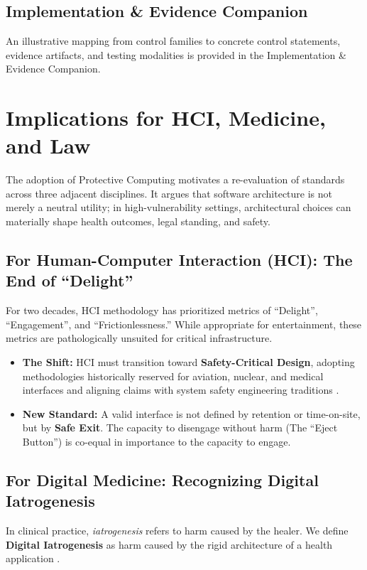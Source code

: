 \documentclass[12pt]{article}
\begin{document}
\subsection{Implementation \& Evidence Companion}
An illustrative mapping from control families to concrete control statements, evidence artifacts, and testing modalities is provided in the Implementation \& Evidence Companion.

\section{Implications for HCI, Medicine, and Law}

The adoption of Protective Computing motivates a re-evaluation of standards across three adjacent disciplines. It argues that software architecture is not merely a neutral utility; in high-vulnerability settings, architectural choices can materially shape health outcomes, legal standing, and safety.

\subsection{For Human-Computer Interaction (HCI): The End of ``Delight''}
For two decades, HCI methodology has prioritized metrics of ``Delight'', ``Engagement'', and ``Frictionlessness.'' While appropriate for entertainment, these metrics are pathologically unsuited for critical infrastructure.

\begin{itemize}
\item \textbf{The Shift:} HCI must transition toward \textbf{Safety-Critical Design}, adopting methodologies historically reserved for aviation, nuclear, and medical interfaces and aligning claims with system safety engineering traditions \cite{leveson1995safeware}.
\item \textbf{New Standard:} A valid interface is not defined by retention or time-on-site, but by \textbf{Safe Exit}. The capacity to disengage without harm (The ``Eject Button'') is co-equal in importance to the capacity to engage.
\end{itemize}

\subsection{For Digital Medicine: Recognizing Digital Iatrogenesis}
In clinical practice, \emph{iatrogenesis} refers to harm caused by the healer. We define \textbf{Digital Iatrogenesis} as harm caused by the rigid architecture of a health application \cite{iom2012healthit}.
\end{document}
